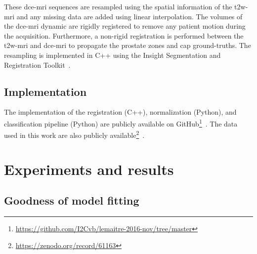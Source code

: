 These \ac{dce}-\ac{mri} sequences are resampled using the spatial
information of the \ac{t2w}-\ac{mri} and any missing data are added using linear interpolation.
The volumes of the \ac{dce}-\ac{mri} dynamic are rigidly registered to remove any patient motion during the acquisition.
Furthermore, a non-rigid registration is performed between the \ac{t2w}-\ac{mri} and \ac{dce}-\ac{mri} to propagate the prostate zones and \ac{cap} ground-truths.
The resampling is implemented in C++ using the Insight Segmentation and Registration Toolkit~\citep{ibanez2005itk}.

\subsection{Implementation}

The implementation of the registration (C++), normalization (Python), and classification pipeline (Python) are publicly available on GitHub\footnote{\url{https://github.com/I2Cvb/lemaitre-2016-nov/tree/master}}~\citep{lemaitre2016github}.
The data used in this work are also publicly available\footnote{\url{https://zenodo.org/record/61163}}~\citep{lemaitre2016dce}.

\section{Experiments and results}\label{sec:experiments}

\subsection{Goodness of model fitting}\label{sec:fit}


\begin{table}
  \caption{Coefficient of determination $R^{2}$ (i.e., $\mu \ (\pm \sigma)$), while fitting data with the different quantification models.}
  \centering
  \label{tab:r2}
\end{table}

